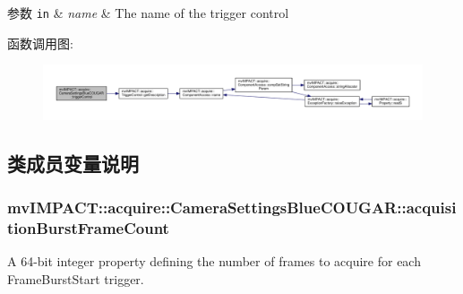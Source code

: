 \begin{DoxyParams}[1]{参数}
\mbox{\tt in}  & {\em name} & The name of the trigger control \\
\hline
\end{DoxyParams}


函数调用图\+:
\nopagebreak
\begin{figure}[H]
\begin{center}
\leavevmode
\includegraphics[width=350pt]{classmv_i_m_p_a_c_t_1_1acquire_1_1_camera_settings_blue_c_o_u_g_a_r_a048c0ffe1e1508fe7b185052dd9d1d7e_cgraph}
\end{center}
\end{figure}




\subsection{类成员变量说明}
\hypertarget{classmv_i_m_p_a_c_t_1_1acquire_1_1_camera_settings_blue_c_o_u_g_a_r_a7c28e067bd7ce1304cc681ac1f176c24}{
\subsubsection[{acquisition\+Burst\+Frame\+Count}]{ mv\+I\+M\+P\+A\+C\+T\+::acquire\+::\+Camera\+Settings\+Blue\+C\+O\+U\+G\+A\+R\+::acquisition\+Burst\+Frame\+Count}}\label{classmv_i_m_p_a_c_t_1_1acquire_1_1_camera_settings_blue_c_o_u_g_a_r_a7c28e067bd7ce1304cc681ac1f176c24}


A 64-\/bit integer property defining the number of frames to acquire for each Frame\+Burst\+Start trigger. 

